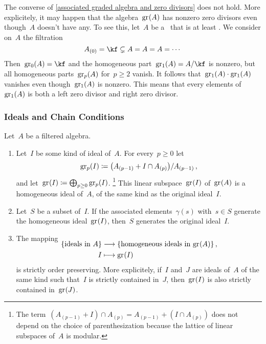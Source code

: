 \begin{remark}
	The converse of \cref{associated graded algebra and zero divisors} does not hold.
	More explicitely, it may happen that the algebra~$\gr(A)$ has nonzero zero divisors even though~$A$ doesn’t have any.
	To see this, let~$A$ be a~\algebra{$\kf$} that is at least {\twodimensional}.
	We consider on~$A$ the filtration
	\[
		A_{(0)}
		=
		\kf
		\subsetneq
		A
		=
		A
		=
		A
		=
		\dotsb
	\]
	Then~$\gr[0](A) = \kf$ and the homogeneous part~$\gr[1](A) = A / {\kf}$ is nonzero, but all homogeneous parts~$\gr[p](A)$ for~$p \geq 2$ vanish.
	It follows that~$\gr[1](A) \cdot \gr[1](A)$ vanishes even though~$\gr[1](A)$ is nonzero.
	This means that every elements of~$\gr[1](A)$ is both a left zero divisor and right zero divisor.
\end{remark}

\subsubsection{Ideals and Chain Conditions}

\begin{proposition}
	\label{associated graded ideals}
	Let~$A$ be a filtered algebra.
	\begin{enumerate}
		\item
			Let~$I$ be some kind of ideal of~$A$.
			For every~$p \geq 0$ let
			\[
				\gr[p](I)
				\defined
				\bigl( A_{(p-1)} + I \cap A_{(p)} \bigr) / A_{(p-1)} \,,
			\]
			and let~$\gr(I) \defined \bigoplus_{p \geq 0} \gr[p](I)$.%
			\footnote{
				The term~$(A_{(p-1)} + I) \cap A_{(p)} = A_{(p-1)} + (I \cap A_{(p)})$ does not depend on the choice of parenthesization because the lattice of linear subspaces of~$A$ is modular.
			}
			This linear subspace~$\gr(I)$ of~$\gr(A)$ is a homogeneous ideal of~$A$, of the same kind as the original ideal~$I$.
		\item
			\label{pulling back generating set from graded ideal}
			Let~$S$ be a subset of~$I$.
			If the associated elements~$\gamma(s)$ with~$s \in S$ generate the homogeneous ideal~$\gr(I)$, then~$S$ generates the original ideal~$I$.
		\item
			The mapping
			\begin{align*}
				\SwapAboveDisplaySkip
				\{ \text{ideals in~$A$} \}
				&\to
				\{ \text{homogeneous ideals in~$\gr(A)$} \}  \,,
				\\
				I
				&\mapsto
				\gr(I)
			\end{align*}
			is strictly order preserving.
			More explicitely, if~$I$ and~$J$ are ideals of~$A$ of the same kind such that~$I$ is strictly contained in~$J$, then~$\gr(I)$ is also strictly contained in~$\gr(J)$.
	\end{enumerate}
\end{proposition}


